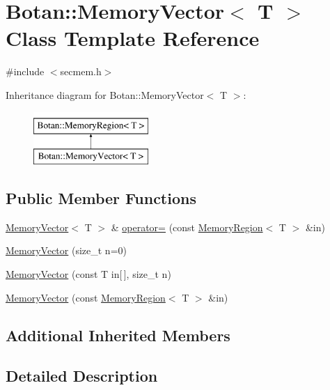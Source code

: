 \hypertarget{classBotan_1_1MemoryVector}{\section{Botan\-:\-:Memory\-Vector$<$ T $>$ Class Template Reference}
\label{classBotan_1_1MemoryVector}
}


{\ttfamily \#include $<$secmem.\-h$>$}

Inheritance diagram for Botan\-:\-:Memory\-Vector$<$ T $>$\-:\begin{figure}[H]
\begin{center}
\leavevmode
\includegraphics[height=2.000000cm]{classBotan_1_1MemoryVector}
\end{center}
\end{figure}
\subsection*{Public Member Functions}
\begin{DoxyCompactItemize}
\item 
\hyperlink{classBotan_1_1MemoryVector}{Memory\-Vector}$<$ T $>$ \& \hyperlink{classBotan_1_1MemoryVector_a6755b350ec13d7053876d00ab37fff85}{operator=} (const \hyperlink{classBotan_1_1MemoryRegion}{Memory\-Region}$<$ T $>$ \&in)
\item 
\hyperlink{classBotan_1_1MemoryVector_a002ae195ded37a897b5778879df5d35d}{Memory\-Vector} (size\-\_\-t n=0)
\item 
\hyperlink{classBotan_1_1MemoryVector_a2a29fc50650189050410420c5cba2331}{Memory\-Vector} (const T in\mbox{[}$\,$\mbox{]}, size\-\_\-t n)
\item 
\hyperlink{classBotan_1_1MemoryVector_a684ca03fc991e1d786762d1dfd8a224d}{Memory\-Vector} (const \hyperlink{classBotan_1_1MemoryRegion}{Memory\-Region}$<$ T $>$ \&in)
\end{DoxyCompactItemize}
\subsection*{Additional Inherited Members}


\subsection{Detailed Description}
